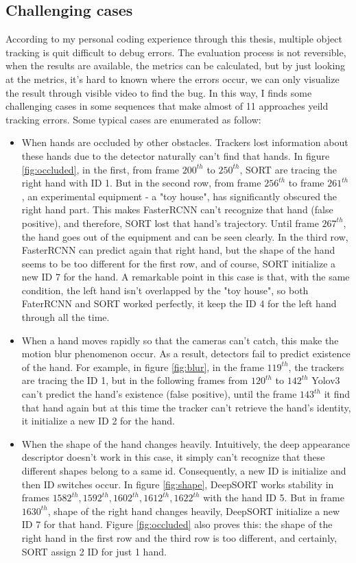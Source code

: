 \subsection{Challenging cases}
According to my personal coding experience through this thesis, multiple object tracking is quit difficult to debug errors. The evaluation process is not reversible, when the results are available, the metrics can be calculated, but by just looking at the metrics, it’s hard to known where the errors occur, we can only visualize the result through visible video to find the bug. In this way, I finds some challenging cases in some sequences that make almost of 11 approaches yeild tracking errors. Some typical cases are enumerated as follow:
\begin{itemize}
	\item When hands are occluded by other obstacles. Trackers lost information about these hands due to the detector naturally can't find that hands. In figure \ref{fig:occluded}, in the first, from frame \(200^{th}\) to \(250^{th}\), SORT are tracing the right hand with ID 1. But in the second row, from frame \(256^{th}\) to frame \(261^{th}\), an experimental equipment - a "toy house", has significantly obscured the right hand part. This makes FasterRCNN can't recognize that hand (false positive), and therefore, SORT lost that hand's trajectory. Until frame \(267^{th}\), the hand goes out of the equipment and can be seen clearly. In the third row, FasterRCNN can predict again that right hand, but the shape of the hand seems to be too different for the first row, and of course, SORT initialize a new ID 7 for the hand. A remarkable point in this case is that, with the same condition, the left hand isn't overlapped by the "toy house", so both FaterRCNN and SORT worked perfectly, it keep the ID 4 for the left hand through all the time.
	\item When a hand moves rapidly so that the cameras can’t catch, this make the motion blur phenomenon occur. As a result, detectors fail to predict existence of the hand. For example, in figure \ref{fig:blur}, in the frame \(119^{th}\), the trackers are tracing the ID 1, but in the following frames from \(120^{th}\) to \(142^{th}\) Yolov3 can't predict the hand's existence (false positive), until the frame \(143^{th}\) it find that hand again but at this time the tracker can't retrieve the hand's identity, it initialize a new ID 2 for the hand.
	\item When the shape of the hand changes heavily. Intuitively, the deep appearance descriptor doesn't work in this case, it simply can't recognize that these different shapes belong to a same id. Consequently, a new ID is initialize and then ID switches occur. In figure \ref{fig:shape}, DeepSORT works stability in frames \(1582^{th}, 1592^{th}, 1602^{th}, 1612^{th}, 1622^{th}\) with the hand ID 5. But in frame \(1630^{th}\), shape of the right hand changes heavily, DeepSORT initialize a new ID 7 for that hand. Figure \ref{fig:occluded} also proves this: the shape of the right hand in the first row and the third row is too different, and certainly, SORT assign 2 ID for just 1 hand.

\end{itemize}
